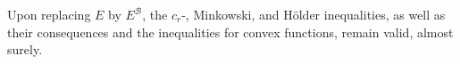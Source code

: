 Upon replacing $E$ by $E^{\mathcal{B}}$, the $c_r$-, Minkowski, and H\"{o}lder inequalities, as well as their consequences and the inequalities for convex functions, remain valid, almost surely.
